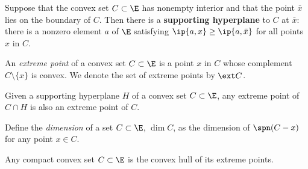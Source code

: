 \documentclass[../borwein-lewis_notes.tex]{subfiles}
\begin{document}
\begin{theorem}
\label{4.1.6}
Suppose that the convex set $C\subset\E$ has nonempty interior and that 
the point $\bar x$ lies on the boundary of $C$. Then there is a 
\textbf{supporting hyperplane} to $C$ at $\bar x$: there is a nonzero
element $a$ of $\E$ satisfying $\ip{a,x}\geq\ip{a,\bar x}$ for all points
$x$ in $C$.
\end{theorem}
An \textit{extreme point} of a convex set $C\subset\E$ is a point $x$ 
in $C$ whose complement $C\setminus\{x\}$ is convex. We denote the set 
of extreme points by $\ext C$. 
\begin{lemma}[4.1.7]
Given a supporting hyperplane $H$ of a convex set $C\subset\E$, any 
extreme point of $C\cap H$ is also an extreme point of $C$.
\end{lemma}
Define the \textit{dimension} of a set $C\subset \E$, $\dim C$, as 
the dimension of $\spn(C-x)$ for any point $x\in C$.
\begin{theorem}[4.1.8 (Minkowski)]
Any compact convex set $C\subset\E$ is the convex hull of its extreme 
points.
\end{theorem}
\end{document}
